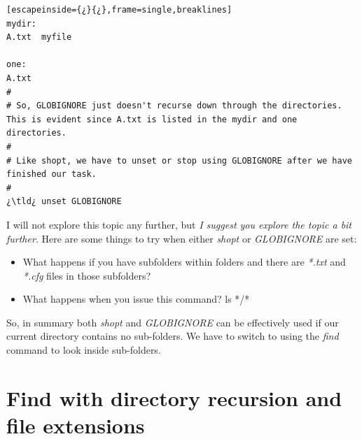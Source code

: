 \begin{lstlisting}[escapeinside={¿}{¿},frame=single,breaklines]
mydir:
A.txt  myfile

one:
A.txt
#
# So, GLOBIGNORE just doesn't recurse down through the directories. This is evident since A.txt is listed in the mydir and one directories.
#
# Like shopt, we have to unset or stop using GLOBIGNORE after we have finished our task.
#
¿\tld¿ unset GLOBIGNORE
\end{lstlisting}

I will not explore this topic any further, but \textit{I suggest you explore the topic a bit further}. Here are some things to try when either \emph{shopt} or \emph{GLOBIGNORE} are set:

\begin{itemize}
	\item[] What happens if you have subfolders within folders and there are \textsl{*.txt} and \textsl{*.cfg} files in those subfolders?
	\item[] What happens when you issue this command? ls */*
\end{itemize}
	
So, in summary both \emph{shopt} and \emph{GLOBIGNORE} can be effectively used if our current directory contains no sub-folders. We have to switch to using the \emph{find} command to look inside sub-folders.

\section{Find with directory recursion and file extensions}

